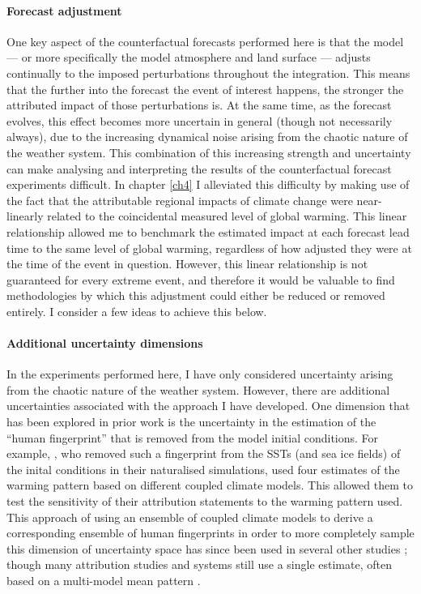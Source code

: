   \paragraph*{Forecast adjustment}

    One key aspect of the counterfactual forecasts performed here is that the model --- or more specifically the model atmosphere and land surface --- adjusts continually to the imposed perturbations throughout the integration. This means that the further into the forecast the event of interest happens, the stronger the attributed impact of those perturbations is. At the same time, as the forecast evolves, this effect becomes more uncertain in general (though not necessarily always), due to the increasing dynamical noise arising from the chaotic nature of the weather system. This combination of this increasing strength and uncertainty can make analysing and interpreting the results of the counterfactual forecast experiments difficult. In chapter \ref{ch4} I alleviated this difficulty by making use of the fact that the attributable regional impacts of climate change were near-linearly related to the coincidental measured level of global warming. This linear relationship allowed me to benchmark the estimated impact at each forecast lead time to the same level of global warming, regardless of how adjusted they were at the time of the event in question. However, this linear relationship is not guaranteed for every extreme event, and therefore it would be valuable to find methodologies by which this adjustment could either be reduced or removed entirely. I consider a few ideas to achieve this below.

  \paragraph*{Additional uncertainty dimensions}

    In the experiments performed here, I have only considered uncertainty arising from the chaotic nature of the weather system. However, there are additional uncertainties associated with the approach I have developed. One dimension that has been explored in prior work is the uncertainty in the estimation of the ``human fingerprint'' that is removed from the model initial conditions. For example, \citet{pall_anthropogenic_2011}, who removed such a fingerprint from the SSTs (and sea ice fields) of the inital conditions in their naturalised simulations, used four estimates of the warming pattern based on different coupled climate models. This allowed them to test the sensitivity of their attribution statements to the warming pattern used. This approach of using an ensemble of coupled climate models to derive a corresponding ensemble of human fingerprints in order to more completely sample this dimension of uncertainty space has since been used in several other studies \citep{schaller_human_2016}; though many attribution studies and systems still use a single estimate, often based on a multi-model mean pattern \citep{ciavarella_upgrade_2018,stone_benchmark_2021}. 

